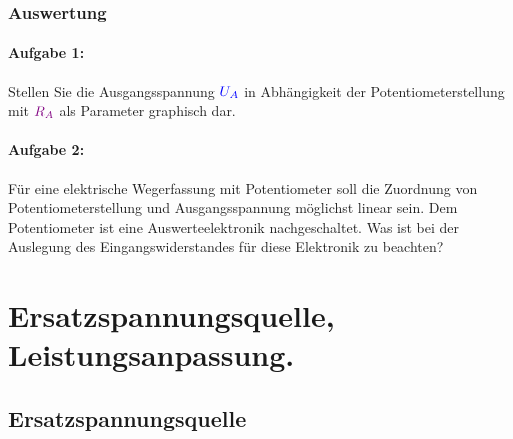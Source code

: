 \documentclass[11pt,a4paper,titlepage]{scrreprt}
\begin{document}
        \subsection{Auswertung}
          \subsubsection{Aufgabe 1:} Stellen Sie die Ausgangsspannung $\textcolor{blue}{U_A}$ in Abhängigkeit der Potentiometerstellung
          mit $\textcolor{violet}{R_A}$ als Parameter graphisch dar.
          \subsubsection{Aufgabe 2:}  Für eine elektrische Wegerfassung mit Potentiometer soll die Zuordnung von Potentiometerstellung und Ausgangsspannung möglichst linear sein. Dem Potentiometer ist eine Auswerteelektronik nachgeschaltet. Was ist bei der Auslegung des Eingangswiderstandes für diese Elektronik zu beachten?

    \chapter{Ersatzspannungsquelle, Leistungsanpassung.}


        \section{Ersatzspannungsquelle}
\end{document}
